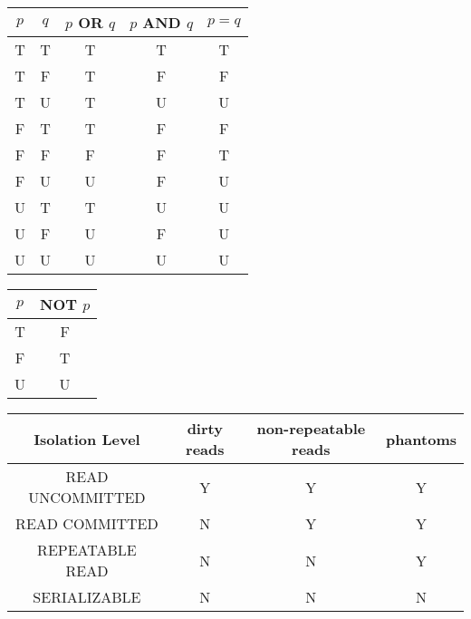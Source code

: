 \documentclass[landscape,8pt]{extarticle}
\begin{document}
\begin{multicols}{4}
    \begin{center}
        \begin{tabular}{ | c | c | c | c | c | } \hline
            $p$ & $q$ & $p$ OR $q$ & $p$ AND $q$ & $p = q$ \\ \hline
            T   & T   & T          & T           & T       \\ \hline
            T   & F   & T          & F           & F       \\ \hline
            T   & U   & T          & U           & U       \\ \hline
            F   & T   & T          & F           & F       \\ \hline
            F   & F   & F          & F           & T       \\ \hline
            F   & U   & U          & F           & U       \\ \hline
            U   & T   & T          & U           & U       \\ \hline
            U   & F   & U          & F           & U       \\ \hline
            U   & U   & U          & U           & U       \\ \hline
        \end{tabular}
    \end{center}
    \begin{center}
        \begin{tabular}{| c | c |} \hline
            $p$ & NOT $p$ \\ \hline
            T   & F       \\ \hline
            F   & T       \\ \hline
            U   & U       \\ \hline
        \end{tabular}
    \end{center}
    \begin{center}
        \begin{adjustbox}{angle=270}
            \begin{tabular}{| c | c | c | c |} \hline
                Isolation Level  & dirty reads & non-repeatable reads & phantoms \\ \hline
                READ UNCOMMITTED & Y           & Y                    & Y        \\ \hline
                READ COMMITTED   & N           & Y                    & Y        \\ \hline
                REPEATABLE READ  & N           & N                    & Y        \\ \hline
                SERIALIZABLE     & N           & N                    & N        \\ \hline
            \end{tabular}
        \end{adjustbox}
    \end{center}
\end{multicols}
\end{document}

